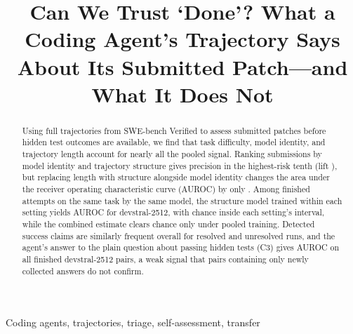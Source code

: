 \title{Can We Trust `Done'? What a Coding Agent's Trajectory Says About Its Submitted Patch---and What It Does Not}
\author{}
\maketitle

\begin{abstract}
Using full trajectories from SWE-bench Verified to assess submitted patches before hidden test outcomes are available, we find that task difficulty, model identity, and trajectory length account for nearly all the pooled signal. Ranking submissions by model identity and trajectory structure gives precision  in the highest-risk tenth (lift ), but replacing length with structure alongside model identity changes the area under the receiver operating characteristic curve (AUROC) by only . Among finished attempts on the same task by the same model, the structure model trained within each setting yields AUROC  for devstral-2512, with chance inside each setting's interval, while the combined estimate clears chance only under pooled training. Detected success claims are similarly frequent overall for resolved and unresolved runs, and the agent's answer to the plain question about passing hidden tests (C3) gives AUROC  on all finished devstral-2512 pairs, a weak signal that pairs containing only newly collected answers do not confirm.
\end{abstract}

\begin{IEEEkeywords}
Coding agents, trajectories, triage, self-assessment, transfer
\end{IEEEkeywords}
